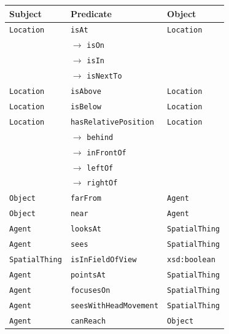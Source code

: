 \documentclass[compress]{beamer}
\newcommand{\concept}[1]{{\scriptsize \texttt{#1}}}
\begin{document}
{
\begin{frame}{}
        \centering
        \scriptsize

        \begin{tabular}{p{1.5cm}lp{2cm}}
            Subject & Predicate  & Object  \\ 
            \hline
            \concept{Location} & \concept{isAt}  &  \concept{Location}  \\ 
                               &  $\rightarrow$ \concept{isOn}  &   \\ 
                               &  $\rightarrow$ \concept{isIn}  &   \\ 
                               &  $\rightarrow$ \concept{isNextTo}  &   \\ 

            \concept{Location}  & \concept{isAbove}  &  \concept{Location} \\ 
            \concept{Location}  & \concept{isBelow}  & \concept{Location} \\
            \hline
            \concept{Location}  & \concept{hasRelativePosition}  & \concept{Location}  \\ 
                                   & 	$\rightarrow$ \concept{behind} & \\ 
                                      &  $\rightarrow$ \concept{inFrontOf}  & \\ 
                                         &  $\rightarrow$ \concept{leftOf}  &  \\ 
                                            &  $\rightarrow$ \concept{rightOf}  & 	 \\ 
            \concept{Object}  & \concept{farFrom}  &  \concept{Agent} \\ 
            \concept{Object}  & \concept{near}  &  \concept{Agent} \\

            \hline
            \concept{Agent}  & \concept{looksAt}  & \concept{SpatialThing} \\
            \concept{Agent}  & \concept{sees}  &  \concept{SpatialThing}  \\ 
            \concept{SpatialThing}  & \concept{isInFieldOfView}  & \concept{xsd:boolean}  \\ 
            \concept{Agent}  & \concept{pointsAt}  & \concept{SpatialThing} \\ 
            \concept{Agent}  & \concept{focusesOn}  &  \concept{SpatialThing}  \\ 
            \concept{Agent} & \concept{seesWithHeadMovement} &  \concept{SpatialThing} \\
            \concept{Agent} & \concept{canReach} &  \concept{Object} \\ 

        \end{tabular}

\end{frame}
}
\end{document}

